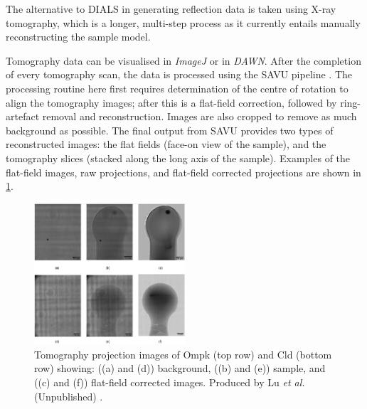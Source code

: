 
The alternative to DIALS in generating reflection data is taken using X-ray tomography, which is a longer, multi-step process as it currently entails manually reconstructing the sample model.

Tomography data can be visualised in \textit{ImageJ} or in \textit{DAWN}. After the completion of every tomography scan, the data is processed using the SAVU pipeline \cite{Kazantsev2022}. The processing routine here first requires determination of the centre of rotation to align the tomography images; after this is a flat-field correction, followed by ring-artefact removal and reconstruction. Images are also cropped to remove as much background as possible. The final output from SAVU provides two types of reconstructed images: the flat fields (face-on view of the sample), and the tomography slices (stacked along the long axis of the sample). Examples of the flat-field images, raw projections, and flat-field corrected projections are shown in \cref{fig:tomo projections}.

\begin{figure}
    \centering
    \includegraphics[width = 0.5\textwidth]{images/Tomo projection images CLD and Ompk high quality.png}
    \caption{Tomography projection images of Ompk (top row) and Cld (bottom row) showing: ((a) and (d)) background,  ((b) and (e)) sample, and ((c) and (f)) flat-field corrected images. Produced by Lu \textit{et al.} (Unpublished) \cite{Lu2024}.}
    \label{fig:tomo projections}
\end{figure}

